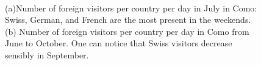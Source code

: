 
\begin{figure}[p]
\centering
{}\\
\caption{(a)Number of foreign visitors per country per day in July in Como: Swiss, German, and French are the most present in the weekends. (b) Number of foreign visitors per country per day in Como from June to October. One can notice that Swiss visitors decrease sensibly in September.}
        \label{fig:como_country_day}
\end{figure}

